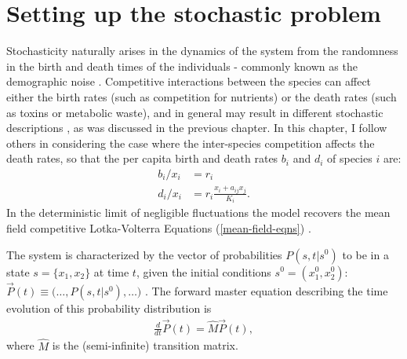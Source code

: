 \section{Setting up the stochastic problem}
Stochasticity naturally arises in the dynamics of the system from the randomness in the birth and death times of the individuals - commonly known as the demographic noise \cite{VanKampen1992,Elgart2004a,Parker2009,Assaf2006}. 
Competitive interactions between the species can affect either the birth rates (such as competition for nutrients) or the death rates (such as toxins or metabolic waste), and in general may result in different stochastic descriptions \cite{Allen2003a,Badali2018}, as was discussed in the previous chapter. 
In this chapter, I follow others \cite{Lin2012,Gabel2013,Constable2015} in considering the case where the inter-species competition affects the death rates, so that the per capita birth and death rates $b_i$ and $d_i$ of species $i$ are:
\begin{equation}
\begin{aligned}
b_i/x_i &= r_i \\
d_i/x_i &= r_i\frac{x_i+a_{ij}x_j}{K_i}.  \label{deathrate}
\end{aligned}
\end{equation}
In the deterministic limit of negligible fluctuations the model recovers the mean field competitive Lotka-Volterra Equations (\ref{mean-field-eqns}) \cite{Lin2012}. 

The system is characterized by the vector of probabilities $P(s,t|s^0)$ to be in a state $s=\{x_1,x_2\}$ at time $t$, given the initial conditions $s^0=(x_1^{0},x_2^{0})$: $\vec{P}(t)\equiv\big(\dots,P(s,t|s^0),\dots \big)$ \cite{Munsky2006}. 
The forward master equation describing the time evolution of this probability distribution is \cite{VanKampen1992}
\begin{align} \label{matrix-master-eqn}
\frac{d}{dt}\vec{P}(t) = \hat{M}\vec{P}(t),
\end{align}
where $\hat{M}$ is the (semi-infinite) transition matrix. %

